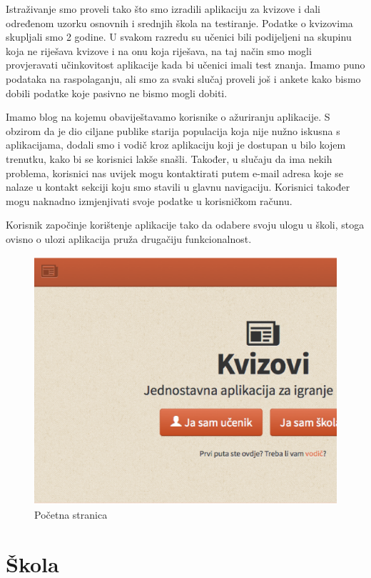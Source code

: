 \documentclass{scrreprt}
\begin{document}
Istraživanje smo proveli tako što smo izradili aplikaciju za kvizove i dali
određenom uzorku osnovnih i srednjih škola na testiranje. Podatke o kvizovima
skupljali smo 2 godine. U svakom razredu su učenici bili podijeljeni na skupinu
koja ne riješava kvizove i na onu koja riješava, na taj način smo mogli
provjeravati učinkovitost aplikacije kada bi učenici imali test znanja. Imamo
puno podataka na raspolaganju, ali smo za svaki slučaj proveli još i ankete kako
bismo dobili podatke koje pasivno ne bismo mogli dobiti.

Imamo blog na kojemu obaviještavamo korisnike o ažuriranju aplikacije. S obzirom
da je dio ciljane publike starija populacija koja nije nužno iskusna s
aplikacijama, dodali smo i vodič kroz aplikaciju koji je dostupan u bilo kojem
trenutku, kako bi se korisnici lakše snašli. Također, u slučaju da ima nekih
problema, korisnici nas uvijek mogu kontaktirati putem e-mail adresa koje se
nalaze u kontakt sekciji koju smo stavili u glavnu navigaciju. Korisnici također
mogu naknadno izmjenjivati svoje podatke u korisničkom računu.

Korisnik započinje korištenje aplikacije tako da odabere svoju ulogu u školi,
stoga ovisno o ulozi aplikacija pruža drugačiju funkcionalnost.

\begin{figure}[H]
  \includegraphics[width=\textwidth, clip=true, trim=0 7cm 0 0, fbox]{home}
  \caption{Početna stranica}
\end{figure}

\section{Škola}
\end{document}
